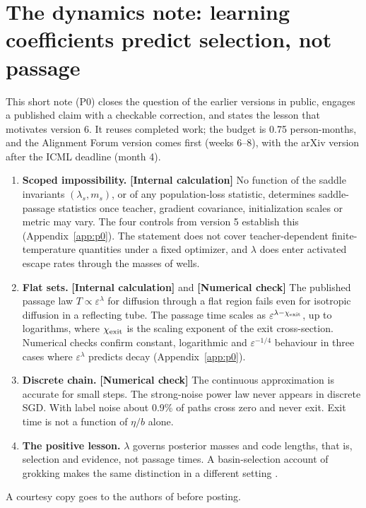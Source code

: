 \documentclass[11pt,a4paper]{article}
\newcommand{\eps}{\varepsilon}
\newcommand{\evl}[2]{{\small\bfseries\color{#1}[#2]}}
\newcommand{\LCalc}{\evl{ccalc}{Internal calculation}}
\newcommand{\LNum}{\evl{cnum}{Numerical check}}
\begin{document}
\section{The dynamics note: learning coefficients predict selection, not passage}
\label{sec:p0}

This short note (P0) closes the question of the earlier versions in
public, engages a published claim with a checkable correction, and
states the lesson that motivates version 6. It reuses completed work;
the budget is 0.75 person-months, and the Alignment Forum version comes first (weeks 6--8), with the arXiv version after the ICML deadline (month 4).

\begin{enumerate}[leftmargin=*]
\item \textbf{Scoped impossibility.} \LCalc{} No function of the saddle
invariants $(\lambda_s,m_s)$, or of any population-loss statistic,
determines saddle-passage statistics once teacher, gradient covariance,
initialization scales or metric may vary. The four controls from
version 5 establish this (Appendix~\ref{app:p0}). The statement does not
cover teacher-dependent finite-temperature quantities under a fixed
optimizer, and $\lambda$ does enter activated escape rates through the
masses of wells.
\item \textbf{Flat sets.} \LCalc{} and \LNum{} The published passage law
$T\propto\eps^\lambda$ for diffusion through a flat region
\cite{hennick2026} fails even for isotropic diffusion in a reflecting
tube. The passage time scales as $\eps^{\lambda-\chi_{\rm exit}}$, up to
logarithms, where $\chi_{\rm exit}$ is the scaling exponent of the exit
cross-section. Numerical checks confirm constant, logarithmic and
$\eps^{-1/4}$ behaviour in three cases where $\eps^\lambda$ predicts
decay (Appendix~\ref{app:p0}).
\item \textbf{Discrete chain.} \LNum{} The continuous approximation is
accurate for small steps. The strong-noise power law never appears in
discrete SGD. With label noise about 0.9\% of paths cross zero and
never exit. Exit time is not a function of $\eta/b$ alone.
\item \textbf{The positive lesson.} $\lambda$ governs posterior masses and
code lengths, that is, selection and evidence, not passage times. A
basin-selection account of grokking makes the same distinction in a
different setting \cite{cullen2026}.
\end{enumerate}
\noindent A courtesy copy goes to the authors of \cite{hennick2026}
before posting.
\end{document}

